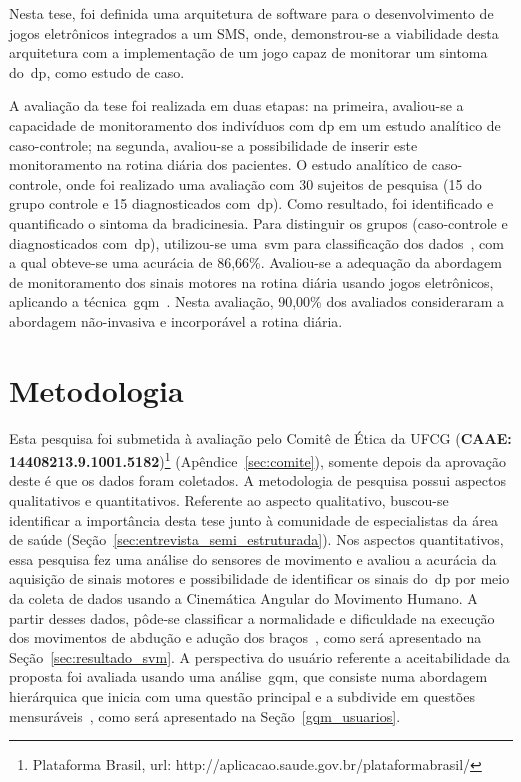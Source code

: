 Nesta tese, foi definida uma arquitetura de software para o desenvolvimento de jogos eletrônicos integrados a um SMS, onde, demonstrou-se a viabilidade desta arquitetura com a implementação de um jogo capaz de monitorar um sintoma do~\ac{dp}, como estudo de caso.


A avaliação da tese foi realizada em duas etapas: na primeira, avaliou-se a capacidade de monitoramento dos indivíduos com \ac{dp} em um estudo analítico de caso-controle; na segunda, avaliou-se a possibilidade de inserir este monitoramento na rotina diária dos pacientes. O estudo analítico de caso-controle, onde foi realizado uma avaliação com 30 sujeitos de pesquisa (15 do grupo controle e 15 diagnosticados com~\ac{dp}). Como resultado, foi identificado e quantificado o sintoma da bradicinesia. Para distinguir os grupos (caso-controle e diagnosticados com~\ac{dp}), utilizou-se uma~\ac{svm} para classificação dos dados~\cite{datamining2005}, com a qual obteve-se uma acurácia de 86,66\%. Avaliou-se a adequação da abordagem de monitoramento dos sinais motores na rotina diária usando jogos eletrônicos, aplicando a técnica~\ac{gqm}~\cite{van1999goal}. Nesta avaliação, 90,00\% dos avaliados consideraram a abordagem não-invasiva e incorporável a rotina diária. 



\section{Metodologia}\label{section:metodologia}
Esta pesquisa foi submetida à avaliação pelo Comitê de Ética da UFCG (\textbf{CAAE: 14408213.9.1001.5182})\footnote{Plataforma Brasil, url: http://aplicacao.saude.gov.br/plataformabrasil/} (Apêndice~\ref{sec:comite}), somente depois da aprovação deste é que os dados foram coletados. A metodologia de pesquisa possui aspectos qualitativos e quantitativos. Referente ao aspecto qualitativo, buscou-se identificar a importância desta tese junto à comunidade de especialistas da área de saúde (Seção~\ref{sec:entrevista_semi_estruturada}). Nos aspectos quantitativos, essa pesquisa fez uma análise do sensores de movimento e avaliou a acurácia da aquisição de sinais motores e possibilidade de identificar os sinais do~\ac{dp} por meio da coleta de dados usando a Cinemática Angular do Movimento Humano. A partir desses dados, pôde-se classificar a normalidade e dificuldade na execução dos movimentos de abdução e adução dos braços~\cite{mcginnis2013biomechanics}, como será apresentado na Seção~\ref{sec:resultado_svm}. A perspectiva do usuário referente a aceitabilidade da proposta foi avaliada usando uma análise~\ac{gqm}, que consiste numa abordagem hierárquica que inicia com uma questão principal e a subdivide em questões mensuráveis~\cite{saraiva2006}, como será apresentado na Seção~\ref{gqm_usuarios}.

